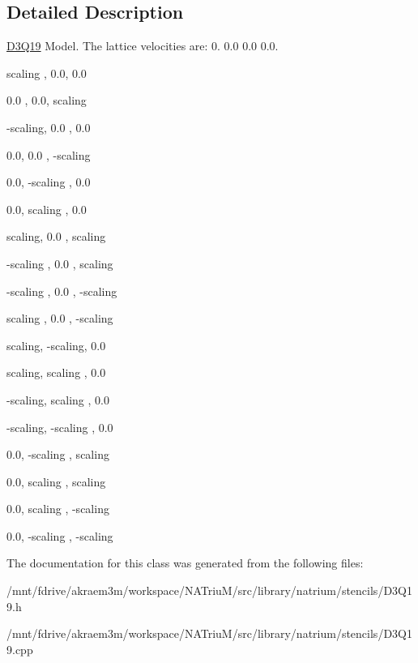 \subsection{Detailed Description}
\hyperlink{classnatrium_1_1D3Q19}{D3Q19} Model. The lattice velocities are: 0. 0.0 0.0 0.0. 
\begin{DoxyEnumerate}
\item scaling , 0.0, 0.0
\item 0.0 , 0.0, scaling
\item -\/scaling, 0.0 , 0.0
\item 0.0, 0.0 , -\/scaling
\item 0.0, -\/scaling , 0.0
\item 0.0, scaling , 0.0
\item scaling, 0.0 , scaling
\item -\/scaling , 0.0 , scaling
\item -\/scaling , 0.0 , -\/scaling
\item scaling , 0.0 , -\/scaling
\item scaling, -\/scaling, 0.0
\item scaling, scaling , 0.0
\item -\/scaling, scaling , 0.0
\item -\/scaling, -\/scaling , 0.0
\item 0.0, -\/scaling , scaling
\item 0.0, scaling , scaling
\item 0.0, scaling , -\/scaling
\item 0.0, -\/scaling , -\/scaling 
\end{DoxyEnumerate}

The documentation for this class was generated from the following files:\begin{DoxyCompactItemize}
\item 
/mnt/fdrive/akraem3m/workspace/NATriuM/src/library/natrium/stencils/D3Q19.h\item 
/mnt/fdrive/akraem3m/workspace/NATriuM/src/library/natrium/stencils/D3Q19.cpp\end{DoxyCompactItemize}
